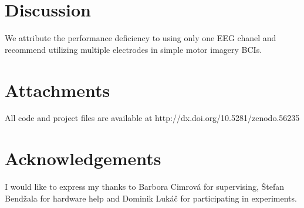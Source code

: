 \documentclass[a1,portrait]{sciposter}
\def\mysection#1{
{\color{sectionCol}\section*{\sc\bfseries #1}}}
\begin{document}
\begin{multicols*}{3}
\mysection{Discussion}
We attribute the performance deficiency to using only one EEG chanel and recommend utilizing multiple electrodes in simple motor imagery BCIs.

\mysection{Attachments}
All code and project files are available at http://dx.doi.org/10.5281/zenodo.56235

\mysection{Acknowledgements}

I would like to express my thanks to Barbora Cimrová for supervising, Štefan Bendžala for hardware help and Dominik Lukáč for participating in experiments.

\begin{small}
{\small}

\end{small}

\end{multicols*}
\end{document}
